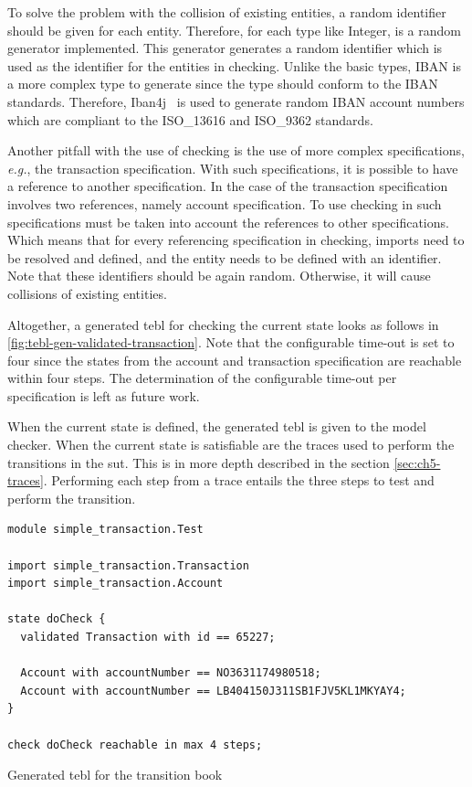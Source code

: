 To solve the
problem with the collision of existing entities, a random identifier should be
given for each entity. Therefore, for each type like Integer, is a random
generator implemented. This generator generates a random identifier which is
used as the identifier for the entities in checking. Unlike the basic types,
IBAN is a more complex type to generate since the type should conform to the
IBAN standards. Therefore, Iban4j~\cite{iban4j} is used to generate random IBAN
account numbers which are compliant to the ISO\_13616 and ISO\_9362 standards.

Another pitfall with the use of checking is the use of more complex
specifications, \textit{e.g.}, the transaction specification. With such
specifications, it is possible to have a reference to another specification. In
the case of the transaction specification involves two references, namely
account specification. To use checking in such specifications must be taken into
account the references to other specifications. Which means that for every
referencing specification in checking, imports need to be resolved and defined,
and the entity needs to be defined with an identifier. Note that these
identifiers should be again random. Otherwise, it will cause collisions of
existing entities.

Altogether, a generated tebl for checking the current state looks as follows in
\autoref{fig:tebl-gen-validated-transaction}. Note that the configurable
time-out is set to four since the states from the account and transaction
specification are reachable within four steps. The determination of the
configurable time-out per specification is left as future work.

When the current state is defined, the generated tebl is given to the model
checker. When the current state is satisfiable are the traces used to perform
the transitions in the \gls{sut}. This is in more depth described in the section
\autoref{sec:ch5-traces}. Performing each step from a trace entails the three
steps to test and perform the transition.

\begin{sourcecode}[h!]
\begin{lstlisting}[]
module simple_transaction.Test

import simple_transaction.Transaction
import simple_transaction.Account

state doCheck {
  validated Transaction with id == 65227;

  Account with accountNumber == NO3631174980518;
  Account with accountNumber == LB404150J311SB1FJV5KL1MKYAY4;
}

check doCheck reachable in max 4 steps;
\end{lstlisting}
\caption{Generated tebl for the transition book}\label{fig:tebl-gen-validated-transaction}
\end{sourcecode}
\FloatBarrier

